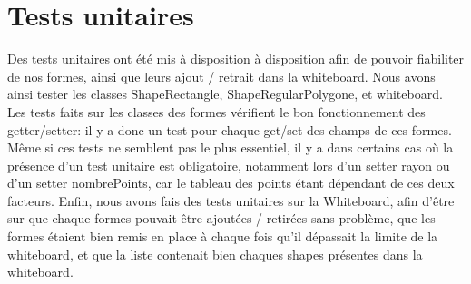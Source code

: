 \chapter{Tests unitaires}


Des tests unitaires ont été mis à disposition à disposition afin de pouvoir
fiabiliter de nos formes, ainsi que leurs ajout / retrait dans la whiteboard.
Nous avons ainsi tester les classes ShapeRectangle, ShapeRegularPolygone, et
whiteboard.\newline
Les tests faits sur les classes des formes vérifient le bon fonctionnement des
getter/setter: il y a donc un test pour chaque get/set des champs de ces formes.
Même si ces tests ne semblent pas le plus essentiel, il y a dans certains cas où la présence d'un test unitaire est obligatoire, notamment lors d'un setter rayon ou d'un setter nombrePoints, car le tableau des points étant dépendant de ces deux facteurs.\newline
Enfin, nous avons fais des tests unitaires sur la Whiteboard, afin d'être sur que chaque formes pouvait être ajoutées / retirées sans problème, que les formes étaient bien remis en place à chaque fois qu'il dépassait la limite de la whiteboard, et que la liste contenait bien chaques shapes présentes dans la whiteboard.
